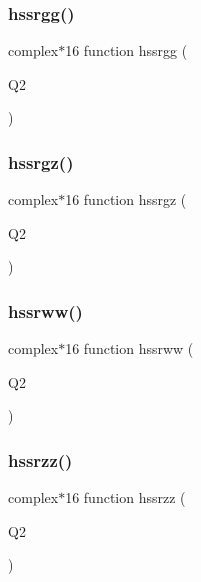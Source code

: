 \mbox{\label{djangoh__h_8f_a8fbe59003676acd8b388d3965e585a66}} 
\subsubsection{\texorpdfstring{hssrgg()}{hssrgg()}}
{\footnotesize\ttfamily complex$\ast$16 function hssrgg (\begin{DoxyParamCaption}\item[{}]{Q2 }\end{DoxyParamCaption})}

\mbox{\label{djangoh__h_8f_ab8dc6ec1b48539fafef87e1abf84d1ac}} 
\subsubsection{\texorpdfstring{hssrgz()}{hssrgz()}}
{\footnotesize\ttfamily complex$\ast$16 function hssrgz (\begin{DoxyParamCaption}\item[{}]{Q2 }\end{DoxyParamCaption})}

\mbox{\label{djangoh__h_8f_a75f51f829e7f7cf9133330bad9a42ac5}} 
\subsubsection{\texorpdfstring{hssrww()}{hssrww()}}
{\footnotesize\ttfamily complex$\ast$16 function hssrww (\begin{DoxyParamCaption}\item[{}]{Q2 }\end{DoxyParamCaption})}

\mbox{\label{djangoh__h_8f_a55e3921f77e29078352fea7906002fba}} 
\subsubsection{\texorpdfstring{hssrzz()}{hssrzz()}}
{\footnotesize\ttfamily complex$\ast$16 function hssrzz (\begin{DoxyParamCaption}\item[{}]{Q2 }\end{DoxyParamCaption})}

